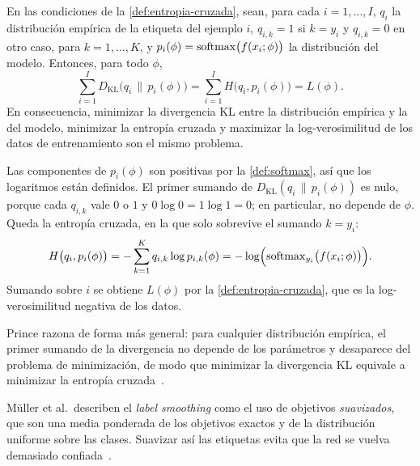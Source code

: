 \begin{proposicion}\label{prop:ce-mv}
En las condiciones de la \cref{def:entropia-cruzada}, sean, para cada
$i = 1,\dots,I$, $q_i$ la distribución empírica de la etiqueta del ejemplo $i$,
$q_{i,k} = 1$ si $k = y_i$ y $q_{i,k} = 0$ en otro caso, para $k = 1,\dots,K$, y
$p_i(\phi) = \operatorname{softmax}\bigl(f(x_i;\phi)\bigr)$ la distribución del modelo. Entonces,
para todo $\phi$,
\[
  \sum_{i=1}^{I} D_{\mathrm{KL}}\bigl(q_i \,\|\, p_i(\phi)\bigr)
  = \sum_{i=1}^{I} H\bigl(q_i, p_i(\phi)\bigr)
  = L(\phi).
\]
En consecuencia, minimizar la divergencia KL entre la distribución empírica y la
del modelo, minimizar la entropía cruzada y maximizar la log-verosimilitud de los
datos de entrenamiento son el mismo problema.
\end{proposicion}
\begin{demostracion}
Las componentes de $p_i(\phi)$ son positivas por la \cref{def:softmax}, así que
los logaritmos están definidos. El primer sumando de
$D_{\mathrm{KL}}(q_i \,\|\, p_i(\phi))$ es nulo, porque cada $q_{i,k}$ vale $0$ o
$1$ y $0\log 0 = 1\log 1 = 0$; en particular, no depende de $\phi$. Queda la
entropía cruzada, en la que solo sobrevive el sumando $k = y_i$:
\[
  H\bigl(q_i, p_i(\phi)\bigr) = -\sum_{k=1}^{K} q_{i,k}\log p_{i,k}(\phi)
  = -\log\Bigl(\operatorname{softmax}_{y_i}\bigl(f(x_i;\phi)\bigr)\Bigr).
\]
Sumando sobre $i$ se obtiene $L(\phi)$ por la \cref{def:entropia-cruzada}, que es
la log-verosimilitud negativa de los datos.
\end{demostracion}

Prince razona de forma más general: para cualquier distribución empírica, el
primer sumando de la divergencia no depende de los parámetros y desaparece del
problema de minimización, de modo que minimizar la divergencia KL equivale a
minimizar la entropía cruzada~\cite[sec.~5.7]{prince2023understanding}.

Müller et al.\ describen el \emph{label smoothing} como el uso de objetivos
\emph{suavizados}, que son una media ponderada de los objetivos exactos y de la
distribución uniforme sobre las clases. Suavizar así las etiquetas evita que la
red se vuelva demasiado confiada~\cite{muller2019}.

